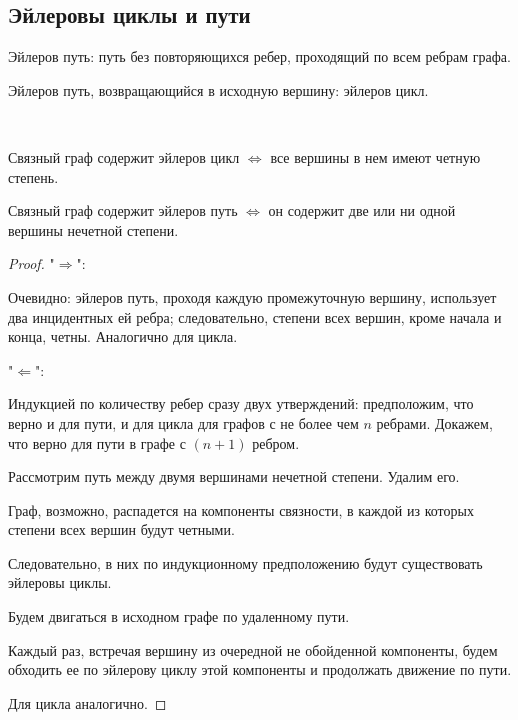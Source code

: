 \subsection{Эйлеровы циклы и пути}

\begin{defn}
    Эйлеров путь: путь без повторяющихся ребер, проходящий по всем ребрам графа.
\end{defn}

\begin{defn}
    Эйлеров путь, возвращающийся в исходную вершину: эйлеров цикл.
\end{defn}

\begin{theorem}~
    
    Связный  граф содержит эйлеров цикл $\iff$ все вершины в нем имеют четную степень.

    Связный граф содержит эйлеров путь $\iff$ он содержит две или ни одной вершины нечетной степени.

\end{theorem}

\begin{proof}
    
    "$\Rightarrow$":

    Очевидно: эйлеров путь, проходя каждую промежуточную вершину, использует два инцидентных ей ребра; следовательно, степени всех вершин, кроме начала и конца, четны. Аналогично для цикла.

    "$\Leftarrow$":

    Индукцией по количеству ребер сразу двух утверждений: предположим, что верно и для пути, и для цикла для графов с не более чем $n$ ребрами. Докажем, что верно для пути в графе с $(n + 1)$ ребром.

    Рассмотрим путь между двумя вершинами нечетной степени. Удалим его.

    Граф, возможно, распадется на компоненты связности, в каждой из которых степени всех вершин будут четными.

    Следовательно, в них по индукционному предположению будут существовать эйлеровы циклы.

    Будем двигаться в исходном графе по удаленному пути.

    Каждый раз, встречая вершину из очередной не обойденной компоненты, будем обходить ее по эйлерову циклу этой компоненты и продолжать движение по пути.

    Для цикла аналогично.

\end{proof}

